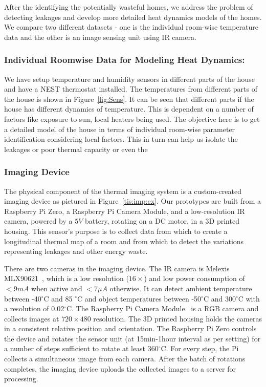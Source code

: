 \documentclass{sig-alternate}
\begin{document}
\indent After the identifying the potentially wasteful homes, we address the problem of detecting leakages and develop more detailed heat dynamics models of the homes. We compare two different datasets - one is the individual room-wise temperature data and the other is an image sensing unit using IR camera. 

\subsubsection{\textbf{Individual Roomwise Data for Modeling Heat Dynamics:}}

\indent We have setup temperature and humidity sensors in different parts of the house and have a NEST thermostat installed. The temperatures from different parts of the house is shown in Figure~\ref{fig:Sens}. It can be seen that different parts if the house has different dynamics of temperature. This is dependent on a number of factors like exposure to sun, local heaters being used. The objective here is to get a detailed model of the house in terms of individual room-wise parameter identification considering local factors. This in turn can help us isolate the leakages or poor thermal capacity or even the  

 
 
\subsubsection{\textbf{Imaging Device}}
 

The physical component of the thermal imaging system is a custom-created imaging device as pictured in Figure~\ref{tis:imp:ex}. Our prototypes are built from a Raspberry Pi Zero, a Raspberry Pi Camera Module, and a low-resolution IR camera, powered by a $5V$ battery, rotating on a DC motor, in a 3D printed housing. This sensor's purpose is to collect data from which to create a longitudinal thermal
map of a room and from which to detect the variations representing leakages and other energy waste.

There are two cameras in the imaging device. The IR camera is Melexis MLX90621~\cite{MLX}, which is a low resolution ($16\times$) and low power consumption of $<9mA$ when active and $<7\mu A$ otherwise. It can detect ambient temperature between  -40$^{\circ}$C  and 85 $^{\circ}$C  and object temperatures between  -50$^{\circ}$C  and  300$^{\circ}$C  with a resolution of  0.02$^{\circ}$C. The Raspberry Pi Camera Module~\cite{picam} is a RGB camera and collects images at $720\times480$ resolution. The 3D printed housing holds the cameras in a consistent relative position and orientation. The Raspberry Pi Zero controls the device and rotates the sensor unit (at 15min-1hour interval as per setting) for a number of steps sufficient to rotate at
least  360$^{\circ}$C. For every step, the Pi collects a simultaneous image from each camera. After the batch of rotations completes, the imaging device uploads the collected images to a server for processing.
\end{document}
